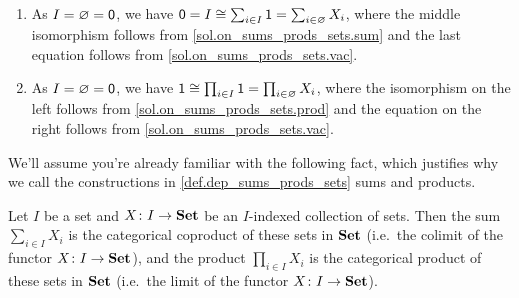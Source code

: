 \documentclass[Book-Poly]{subfiles}
\begin{document}
\begin{exercise}
\begin{solution}
\begin{enumerate}[resume]
    \item As $I = \varnothing = \textsf{0}$, we have $\textsf{0} = I \cong \sum_{i \in I} \textsf{1} = \sum_{i \in \varnothing} X_i$, where the middle isomorphism follows from \cref{sol.on_sums_prods_sets.sum} and the last equation follows from \cref{sol.on_sums_prods_sets.vac}.
    
    \item As $I = \varnothing = \textsf{0}$, we have $\textsf{1} \cong \prod_{i \in I} \textsf{1} = \prod_{i \in \varnothing} X_i$, where the isomorphism on the left follows from \cref{sol.on_sums_prods_sets.prod} and the equation on the right follows from \cref{sol.on_sums_prods_sets.vac}.
\end{enumerate}
\end{solution}
\end{exercise}

We'll assume you're already familiar with the following fact, which justifies why we call the constructions in \cref{def.dep_sums_prods_sets} sums and products.

\begin{proposition}
Let $I$ be a set and $X\colon I\to\mathbf{Set}$ be an $I$-indexed collection of sets. Then the sum $\sum_{i\in I}X_i$ is the categorical coproduct of these sets in $\mathbf{Set}$ (i.e.\ the colimit of the functor $X\colon I\to\mathbf{Set}$), and the product $\prod_{i\in I}X_i$ is the categorical product of these sets in $\mathbf{Set}$ (i.e.\ the limit of the functor $X\colon I\to\mathbf{Set}$).
\end{proposition}
\end{document}
